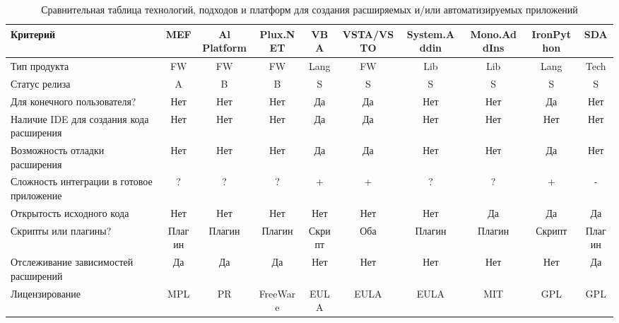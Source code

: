 \begin{landscape}

\begin{table}[H]
  \caption{Сравнительная таблица технологий, подходов и платформ для создания расширяемых и/или автоматизируемых приложений}
  \label{tabular:tech_compare_tab}
  \begin{center}
  \begin{tabular}{|p{4.5cm}|c|c|c|c|c|c|c|c|c|}
  
    \hline
      Критерий &
      MEF &
      Al Platform &
      Plux.NET &
      VBA &
      VSTA/VSTO &
      System.Addin &
      Mono.AddIns &
      IronPython &
      SDA \\
    \hline
      Тип продукта &
      FW &
      FW &
      FW &
      Lang &
      FW &
      Lib &
      Lib &
      Lang &
      Tech \\
    \hline
      Статус релиза &
      A &
      B &
      B &
      S &
      S &
      S &
      S &
      S &
      S \\
    \hline
      Для конечного пользователя? &
      Нет &
      Нет &
      Нет &
      Да &
      Да &
      Нет &
      Нет &
      Да &
      Нет \\
    \hline
      Наличие IDE для создания кода расширения &
      Нет &
      Нет &
      Нет &
      Да &
      Да &
      Нет &
      Нет &
      Нет &
      Нет \\
    \hline
      Возможность отладки расширения &
      Нет &
      Нет &
      Нет &
      Да &
      Да &
      Нет &
      Нет &
      Да &
      Нет \\
    \hline
      Сложность интеграции в готовое приложение &
      ? &
      ? &
      ? &
      + &
      + &
      ? &
      ? &
      + &
      - \\
    \hline
      Открытость исходного кода &
      Нет &
      Нет &
      Нет &
      Нет &
      Нет &
      Нет &
      Да &
      Да &
      Да \\
    \hline
      Скрипты или плагины? &
      Плагин &
      Плагин &
      Плагин &
      Скрипт &
      Оба &
      Плагин &
      Плагин &
      Скрипт &
      Плагин \\
    \hline
      Отслеживание зависимостей расширений &
      Да &
      Да &
      Да &
      Нет &
      Нет &
      Нет &
      Нет &
      Нет &
      Да \\
    \hline
      Лицензирование &
      MPL &
      PR &
      FreeWare &
      EULA &
      EULA &
      EULA &
      MIT &
      GPL &
      GPL \\
    \hline
    
  \end{tabular}
  \end{center}
\end{table}

\end{landscape}

